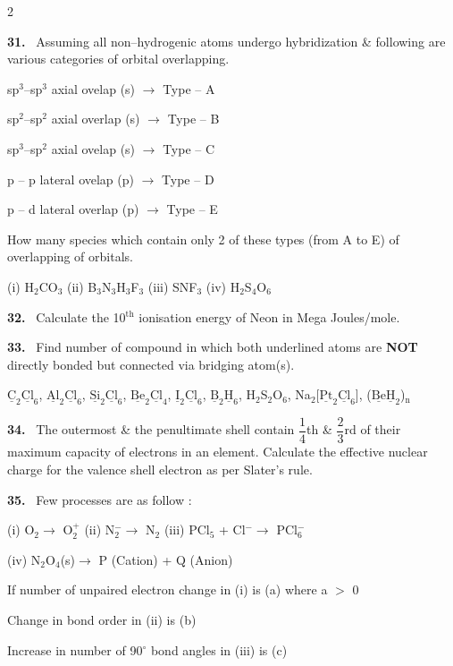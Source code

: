 \documentclass[10pt]{extarticle}
\newcommand{\qn}[1]{\par\smallskip\noindent\textbf{#1.}~}
\newenvironment{qoptions}{\begin{itemize}[leftmargin=1.8em,itemsep=1pt,topsep=2pt,label={}]}{\end{itemize}}
\begin{document}
\begin{multicols}{2}
\begin{qoptions}
\end{qoptions}
\qn{31} Assuming all non--hydrogenic atoms undergo hybridization \& following are various categories of orbital overlapping.\par
sp$^3$--sp$^3$ axial ovelap (s) $\longrightarrow$ Type -- A\par
sp$^2$--sp$^2$ axial overlap (s) $\longrightarrow$ Type -- B\par
sp$^3$--sp$^2$ axial ovelap (s) $\longrightarrow$ Type -- C\par
p -- p lateral ovelap (p) $\longrightarrow$ Type -- D\par
p -- d lateral overlap (p) $\longrightarrow$ Type -- E\par
How many species which contain only 2 of these types (from A to E) of overlapping of orbitals.\par
(i) H$_2$CO$_3$ \hfill (ii) B$_3$N$_3$H$_3$F$_3$ \hfill (iii) SNF$_3$ \hfill (iv) H$_2$S$_4$O$_6$
\qn{32} Calculate the 10$^\mathrm{th}$ ionisation energy of Neon in Mega Joules/mole.\par
[Use N$_\mathrm A$ = 6 $\times$ 10$^{23}$ \& 1 eV = 1.6 $\times$ 10$^{-19}$ J]
\qn{33} Find number of compound in which both underlined atoms are \textbf{NOT} directly bonded but connected via bridging atom(s).\par
$\underline{\mathrm C}_2\underline{\mathrm{Cl}}_6$, $\underline{\mathrm{Al}}_2\underline{\mathrm{Cl}}_6$, $\underline{\mathrm{Si}}_2\underline{\mathrm{Cl}}_6$, $\underline{\mathrm{Be}}_2\underline{\mathrm{Cl}}_4$, $\underline{\mathrm I}_2\underline{\mathrm{Cl}}_6$, $\underline{\mathrm B}_2\underline{\mathrm H}_6$, H$_2$S$_2$O$_6$, Na$_2$[$\underline{\mathrm{Pt}}_2\underline{\mathrm{Cl}}_6$], ($\underline{\mathrm{Be}}\underline{\mathrm H}_2$)$_\mathrm n$
\qn{34} The outermost \& the penultimate shell contain $\dfrac14$th \& $\dfrac23$rd of their maximum capacity of electrons in an element. Calculate the effective nuclear charge for the valence shell electron as per Slater's rule.
\qn{35} Few processes are as follow :\par
(i) O$_2\longrightarrow$ O$_2^+$ \hfill (ii) N$_2^-\longrightarrow$ N$_2$ \hfill (iii) PCl$_5$ + Cl$^-\longrightarrow$ PCl$_6^-$\par
(iv) N$_2$O$_4$(s)$\longrightarrow$ P (Cation) + Q (Anion)\par
If number of unpaired electron change in (i) is (a) where a $>$ 0\par
Change in bond order in (ii) is (b)\par
Increase in number of 90$^\circ$ bond angles in (iii) is (c)\par

\end{multicols}
\end{document}
